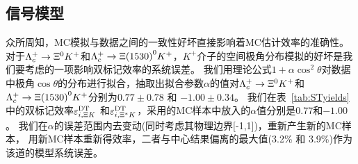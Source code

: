 \subsection{信号模型}
众所周知，MC模拟与数据之间的一致性好坏直接影响着MC估计效率的准确性。
对于$\Lambda_{c}^{+}\rightarrow \Xi^{0}K^{+}$和$\Lambda_{c}^{+}\rightarrow \Xi{(1530)}^{0}K^{+}$，$K^+$介子的空间极角分布模拟的好坏是我们要考虑的一项影响双标记效率的系统误差。
我们用理论公式$1+\alpha \cos^2\theta$对数据中极角$\cos\theta$的分布进行拟合，抽取出拟合参数$\alpha$的值对$\Lambda_{c}^{+}\rightarrow \Xi^{0}K^{+}$和$\Lambda_{c}^{+}\rightarrow \Xi{(1530)}^{0}K^{+}$分别为$0.77\pm0.78$ 和 $-1.00\pm0.34$。
我们在表~\ref{tab:STyields}中的双标记效率$\varepsilon_{i,\Xi K}^{\rm DT}$ 和$\varepsilon_{i,\Xi^{*}K}^{\rm DT}$，采用的MC样本中放入的$\alpha$值分别是$0.77$和$-1.00$。
我们在$\alpha$的误差范围内去变动(同时考虑其物理边界[-1,1])，重新产生新的MC样本，
用新MC样本重新得效率，二者与中心结果偏离的最大值(3.2\% 和 3.9\%)作为该道的模型系统误差。

